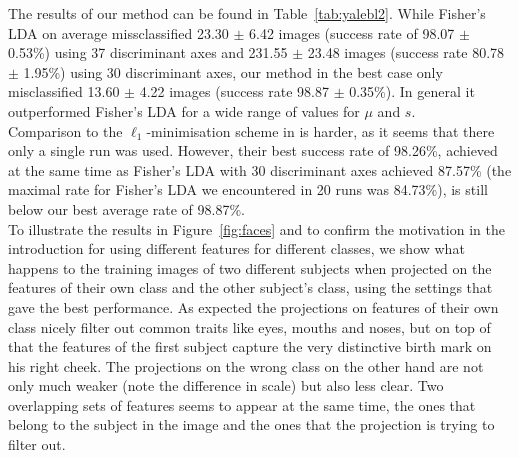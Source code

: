 \documentclass[11pt]{article}
\begin{document}
The results of our method can be found in Table~\ref{tab:yalebl2}. While Fisher's LDA on average missclassified 23.30 $\pm$ 6.42 images (success rate of 98.07 $\pm$ 0.53\%) using 37 discriminant axes and 231.55 $\pm$ 23.48 images (success rate 80.78 $\pm$ 1.95\%) using 30 discriminant axes, our method in the best case only misclassified 13.60 $\pm$ 4.22 images (success rate 98.87 $\pm$ 0.35\%). In general it outperformed Fisher's LDA for a wide range of values for $\mu$ and $s$.\\
Comparison to the $\ell_1$-minimisation scheme in \cite{wrma09} is harder, as it seems that there only a single run was used. However, their best success rate of 98.26\%, achieved at the same time as Fisher's  LDA with 30 discriminant axes achieved 87.57\% (the maximal rate for Fisher's LDA we encountered in 20 runs was 84.73\%), is still below our best average rate of 98.87\%.\\

To illustrate the results in Figure~\ref{fig:faces} and to confirm the motivation in the introduction for using different features for different classes, we show what happens to the training images of two different subjects when projected on the features of their own class and the other subject's class, using the settings that gave the best performance. As expected the projections on features of their own class nicely filter out common traits like eyes, mouths and noses, but on top of that the features of the first subject capture the very distinctive birth mark on his right cheek. The projections on the wrong class on the other hand are not only much weaker (note the difference in scale) but also less clear. Two overlapping sets of features seems to appear at the same time, the ones that belong to the subject in the image and the ones that the projection is trying to filter out.

\end{document}
